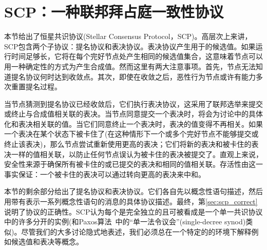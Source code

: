 \section{SCP：一种联邦拜占庭一致性协议}\label{sec:scp}

本节给出了恒星共识协议(Stellar Consensus Protocol，SCP)。高层次上来讲，SCP包含两个子协议：提名协议和表决协议。表决协议产生用于{\slot}的候选值。如果运行时间足够长，它将在每个完好节点处产生相同的候选值集合，这意味着节点可以用一种确定性的方式为{\slot}产生合成值。然而这里有两大注意事项。首先，节点无法知道提名协议何时达到收敛点。其次，即使在收敛之后，恶性行为节点或许有能力多次重置提名过程。

当节点猜测到提名协议已经收敛后，它们执行表决协议，这采用了联邦选举来提交或终止与合成值相关联的表决。当节点同意提交一个表决时，将会为讨论中的{\slot}具体化和表决相关联的值。当它们同意终止一个表决时，表决的值变得不再相关。如果一个表决在某个状态下被卡住了(在这种情形下一个或多个完好节点不能够提交或终止该表决)，那么节点尝试重新使用更高的表决；它们将新的表决和被卡住的表决一样的值相关联，以防止任何节点误认为被卡住的表决被提交了。直观上来说，安全性来源于确保所有被卡住的或已提交的表决和相同的值相关联。存活性由这一事实保证：一个被卡住的表决可以通过转向更高的表决来中和。

本节的剩余部分给出了提名协议和表决协议。它们各自先以概念性语句描述，然后用带有表示一系列概念性语句的消息的具体协议描述。最终，第\ref{sec:scp_correct}说明了协议的正确性。SCP认为每个{\slot}是完全独立的且可被看成是一个单一{\slot}共识协议中的许多分开的实例(和Paxos算法~中的``单一法令议会''(single-decree synod)类似)。尽管我们的大多讨论隐式地表述{\slot}，我们必须总在一个特定的{\slot}的环境下解释例如候选值和表决等概念。



